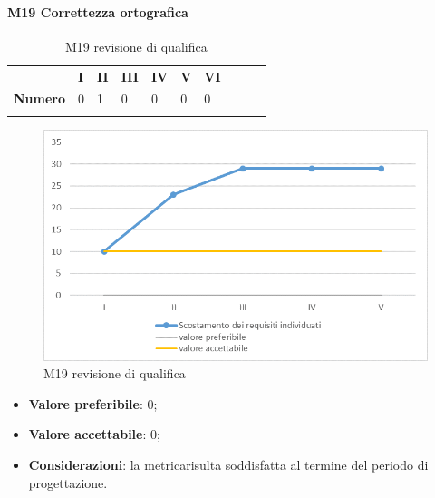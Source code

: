 \begin{itemize}
\begin{itemize}
\paragraph{M19 Correttezza ortografica} \mbox{}
\begin{longtable}[H!] {						
		>{}p{50mm}  		
		>{}p{8mm}
		>{}p{8mm}		
		>{}p{8mm}		
		>{}p{8mm}		
		>{}p{8mm}		
		>{}p{8mm}
		>{}p{8mm}
		>{}p{8mm}
		>{}p{8mm}
	}
	\rowcolor{gray!50}
	\textbf{} & \textbf{I} & \textbf{II} & \textbf{III} & \textbf{IV} & \textbf{V} & \textbf{VI} \TBstrut \\ [2mm]
	\textbf{Numero} & 0 & 1 & 0 & 0 & 0 & 0 \TBstrut \\ [2mm]
	\rowcolor{white}
	\caption{M19 revisione di qualifica}
\end{longtable}
\begin{figure}[H] 	
	\includegraphics[width=\linewidth]{./img/grafici/RP1.png}	
	\caption{M19 revisione di qualifica}	
\end{figure}
\begin{itemize}
	\item \textbf{Valore preferibile}: 0;
	\item \textbf{Valore accettabile}: 0;
	\item \textbf{Considerazioni}: la metrica\glosp risulta soddisfatta al termine del periodo di progettazione\glo.
\end{itemize}




\end{itemize}
\end{itemize}
